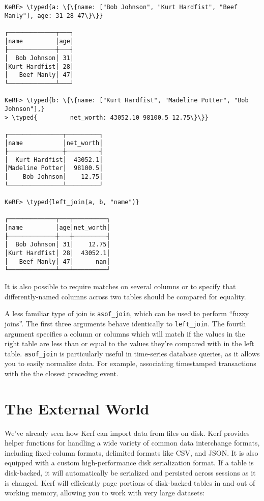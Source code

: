\documentclass{article}
\newcommand{\typed}[1]{\textcolor{TealBlue}{#1}}
\newcommand{\pbreak}[0]{\vspace{0.5cm}}
\begin{document}
\begin{Verbatim}
KeRF> \typed{a: \{\{name: ["Bob Johnson", "Kurt Hardfist", "Beef Manly"], age: 31 28 47\}\}} 

┌─────────────┬───┐
│name         │age│
├─────────────┼───┤
│  Bob Johnson│ 31│
│Kurt Hardfist│ 28│
│   Beef Manly│ 47│
└─────────────┴───┘

KeRF> \typed{b: \{\{name: ["Kurt Hardfist", "Madeline Potter", "Bob Johnson"],}
> \typed{         net_worth: 43052.10 98100.5 12.75\}\}}

┌───────────────┬─────────┐
│name           │net_worth│
├───────────────┼─────────┤
│  Kurt Hardfist│  43052.1│
│Madeline Potter│  98100.5│
│    Bob Johnson│    12.75│
└───────────────┴─────────┘

KeRF> \typed{left_join(a, b, "name")}

┌─────────────┬───┬─────────┐
│name         │age│net_worth│
├─────────────┼───┼─────────┤
│  Bob Johnson│ 31│    12.75│
│Kurt Hardfist│ 28│  43052.1│
│   Beef Manly│ 47│      nan│
└─────────────┴───┴─────────┘
\end{Verbatim}

It is also possible to require matches on several columns or to specify that differently-named columns across two tables should be compared for equality.

\pbreak

A less familiar type of join is \texttt{asof\_join}, which can be used to perform ``fuzzy joins''. The first three arguments behave identically to \texttt{left\_join}. The fourth argument specifies a column or columns which will match if the values in the right table are less than or equal to the values they're compared with in the left table. \texttt{asof\_join} is particularly useful in time-series database queries, as it allows you to easily normalize data. For example, associating timestamped transactions with the the closest preceding event.

\pagebreak
\section{The External World}
We've already seen how Kerf can import data from files on disk. Kerf provides helper functions for handling a wide variety of common data interchange formats, including fixed-column formats, delimited formats like CSV, and JSON. It is also equipped with a custom high-performance disk serialization format. If a table is disk-backed, it will automatically be serialized and persisted across sessions as it is changed. Kerf will efficiently page portions of disk-backed tables in and out of working memory, allowing you to work with very large datasets:
\end{document}
